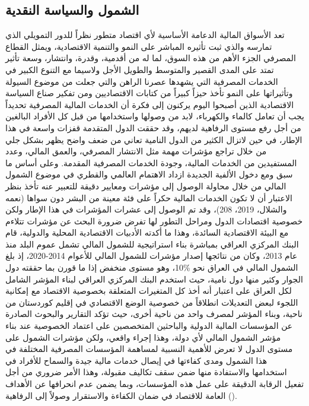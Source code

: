 \documentclass[10pt,a4paper]{report}
\begin{document}
\begin{doublespacing}
\subsection{الشمول والسياسة النقدية}
تعد الأسواق المالية الدعامة الأساسية لأي اقتصاد متطور نظراً للدور التمويلي الذي تمارسه والذي ثبت تأثيره المباشر على النمو والتنمية الاقتصادية، ويمثل القطاع المصرفي الجزء الأهم من هذه السوق، لما له من أقدمية، وقدرة، وانتشار، وسعة تأثير تمتد على المدى القصير والمتوسط والطويل الأجل ولاسيما مع التنوع الكبير في الخدمات المصرفية التي يشهدها عصرنا الراهن والتي جعلت من موضوع السيولة وتأثيراتها على النمو تأخذ حيزاً كبيراً من كتابات الاقتصاديين ومن تفكير صناع السياسة الاقتصادية الذين أصبحوا اليوم يركنون إلى فكرة أن الخدمات المالية المصرفية تحديداً يجب أن تعامل كالماء والكهرباء، لابد من وصولها واستخدامها من قبل كل الأفراد البالغين من أجل رفع مستوى الرفاهية لديهم، وقد حققت الدول المتقدمة قفزات واسعة في هذا الإطار، في حين لاتزال الكثير من الدول النامية تعاني من ضعف واضح يظهر بشكل جلي من خلال تراجع مؤشرات مهمة مثل الانتشار المصرفي، والعمق المالي، وعدد المستفيدين من الخدمات المالية، وجودة الخدمات المصرفية المقدمة. وعلى أساس ما سبق ومع دخول الألفية الجديدة ازداد الاهتمام العالمي والقطري في موضوع الشمول المالي من خلال محاولة الوصول إلى مؤشرات ومعايير دقيقة للتعبير عنه تأخذ بنظر الاعتبار أن لا تكون الخدمات المالية حكراً على فئة معينة من البشر دون سواها ({نعمه والشلال، 2019، 208})، وقد تم الوصول إلى عشرات المؤشرات في هذا الإطار ولكن خصوصية اقتصادات الدول ومراحل التطور لها تفرض ضرورة البحث عن مؤشرات تتلاءم مع البيئة الاقتصادية السائدة، وهذا ما أكدته الأدبيات الاقتصادية المحلية والدولية، قام البنك المركزي العراقي بمباشرة بناء استراتيجية للشمول المالي تشمل عموم البلد منذ عام 2013، وكان من نتائجها إصدار مؤشرات للشمول المالي للأعوام 2014-2020، إذ بلغ الشمول المالي في العراق نحو \%10، وهو مستوى منخفض إذا ما قورن بما حققته دول الجوار وكثير منها دول نامية، حيث استخدم البنك المركزي العراقي لبناء المؤشر الشامل لكل العراق على اعتبار أنه أخذ كل المتغيرات المتعلقة بخصوصية الاقتصاد مع إمكانية اللجوء لبعض التعديلات انطلاقاً من خصوصية الوضع الاقتصادي في إقليم كوردستان من ناحية، وبناء المؤشر لمصرف واحد من ناحية أخرى، حيث تؤكد التقارير والبحوث الصادرة عن المؤسسات المالية الدولية والباحثين المتخصصين على اعتماد الخصوصية عند بناء مؤشر الشمول المالي لأي دولة، وهذا إجراء واقعي، ولكن مؤشرات الشمول على مستوى الدول لا تعرض للأهمية النسبية لمساهمة المؤسسات المصرفية المختلفة في هذا الشمول ومدى كفاءتها في إيصال خدمات مالية جيدة والسماح للأفراد في استخدامها والاستفادة منها ضمن سقف تكاليف مقبولة، وهذا الأمر ضروري من أجل تفعيل الرقابة الدقيقة على عمل هذه المؤسسات، وبما يضمن عدم انحرافها عن الأهداف العامة للاقتصاد في ضمان الكفاءة والاستقرار وصولاً إلى الرفاهية ().


\end{doublespacing}
\end{document}
